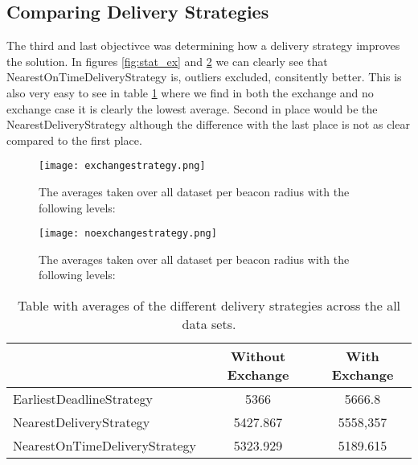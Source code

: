 \documentclass[../main.tex]{subfiles}
\begin{document}
\subsection{Comparing Delivery Strategies}
The third and last objectivce was determining how a delivery strategy improves the solution.
In figures \ref{fig:stat_ex} and \ref{fig:strat_noex} we can clearly see that NearestOnTimeDeliveryStrategy is, outliers excluded, consitently better.
This is also very easy to see in table \ref{tab:avgstrat} where we find in both the exchange and no exchange case it is clearly the lowest average.
Second in place would be the NearestDeliveryStrategy although the difference with the last place is not as clear compared to the first place.
\begin{figure}
	\centering
	\texttt{[image: exchangestrategy.png]}
	\caption{The averages taken over all dataset per beacon radius with the following levels:}
	\label{fig:strat_ex}
\end{figure}

\begin{figure}
	\centering
	\texttt{[image: noexchangestrategy.png]}
	\caption{The averages taken over all dataset per beacon radius with the following levels:}
	\label{fig:strat_noex}
\end{figure}
\begin{table}
\begin{tabular}{lcc}
	\toprule
	& Without Exchange & With Exchange \\
	\midrule
	EarliestDeadlineStrategy & 5366 & 5666.8 \\
	NearestDeliveryStrategy & 5427.867 & 5558,357 \\
	NearestOnTimeDeliveryStrategy & 5323.929 & 5189.615 \\
	\bottomrule
\end{tabular}
\caption{Table with averages of the different delivery strategies across the all data sets.}
\label{tab:avgstrat}
\end{table}
\end{document}

